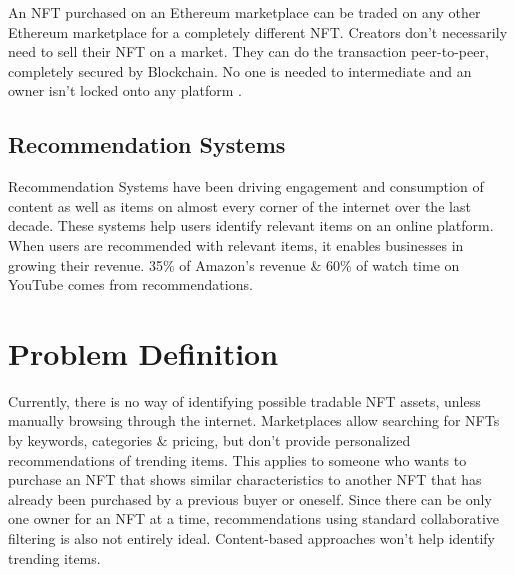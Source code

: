 An NFT purchased on an Ethereum marketplace can be traded on any other Ethereum marketplace for a completely different NFT. Creators don't necessarily need to sell their NFT on a market. They can do the transaction peer-to-peer, completely secured by Blockchain. No one is needed to intermediate and an owner isn't locked onto any platform \autocite{noauthor_erc-721_nodate}.


\subsection{Recommendation Systems}
Recommendation Systems have been driving engagement and consumption of content as well as items on almost every corner of the internet over the last decade.
These systems help users identify relevant items on an online platform. When users are recommended with relevant items, it enables businesses in growing their revenue. 35\% of Amazon’s revenue \autocite{naumov_deep_2019} \& 60\% of watch time on YouTube \autocite{noauthor_recommendations_nodate} comes from recommendations.







\section{Problem Definition}
Currently, there is no way of identifying possible tradable NFT assets, unless manually browsing through the internet. 
Marketplaces allow searching for NFTs by keywords, categories \& pricing, but don't provide personalized recommendations of trending items.
This applies to someone who wants to purchase an NFT that shows similar characteristics to another NFT that has already been purchased by a previous buyer or oneself. Since there can be only one owner for an NFT at a time, recommendations using standard collaborative filtering is also not entirely ideal. Content-based approaches won't help identify trending items.

